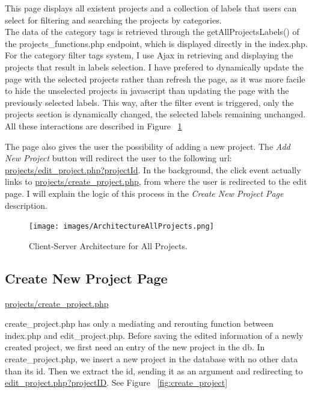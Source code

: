 This page displays all existent projects and a collection of labels that users can select for filtering and searching the projects by categories. \\

The data of the category tags is retrieved through the getAllProjectsLabels() of the projects\_functions.php endpoint, which is displayed directly in the index.php.\\

For the category filter tags system, I use Ajax in retrieving and displaying the projects that result in labels selection. I have prefered to dynamically update the page with the selected projects rather than refresh the page, as it was more facile to hide the unselected projects in javascript than updating the page with the previously selected labels. This way, after the filter event is triggered, only the projects section is dynamically changed, the selected labels remaining unchanged. All these interactions are described in Figure ~\ref{fig:architecture_all_projects}\\ 

The page also gives the user the possibility of adding a new project. The \textit{Add New Project} button will redirect the user to the following url:
\url{projects/edit\_project.php?projectId}. In the background, the click event actually links to \url{projects/create\_project.php}, from where the user is redirected to the edit page. I will explain the logic of this process in the \textit{Create New Project Page} description.

\begin{figure}
\texttt{[image: images/ArchitectureAllProjects.png]}
\caption{Client-Server Architecture for All Projects.}
\label{fig:architecture_all_projects}
\end{figure}

\subsection{Create New Project Page}
\url{projects/create\_project.php}

create\_project.php has only a mediating and rerouting function between index.php and edit\_project.php. Before saving the edited information of a newly created project, we first need an entry of the new project in the db. 
In create\_project.php, we insert a new project in the database with no other data than its id. Then we extract the id, sending it as an argument and redirecting to \url{edit\_project.php?projectID}. See Figure ~\ref{fig:create_project} 

